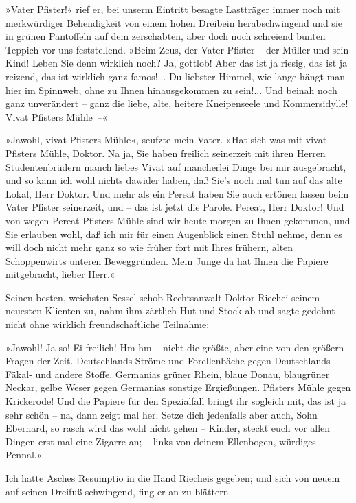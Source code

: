 »Vater Pfister!« rief er, bei unserm Eintritt besagte Lastträger
immer noch mit merkwürdiger Behendigkeit von einem hohen Dreibein
herabschwingend und sie in grünen Pantoffeln auf dem zerschabten,
aber doch noch schreiend bunten Teppich vor uns feststellend. »Beim
Zeus, der Vater Pfister – der Müller und sein Kind! Leben Sie denn
wirklich noch? Ja, gottlob! Aber das ist ja riesig, das ist ja
reizend, das ist wirklich ganz famos!... Du liebster Himmel, wie
lange hängt man hier im Spinnweb, ohne zu Ihnen hinausgekommen zu
sein!... Und beinah noch ganz unverändert – ganz die liebe, alte,
heitere Kneipenseele und Kommersidylle! Vivat Pfisters Mühle~–«

»Jawohl, vivat Pfisters Mühle«, seufzte mein Vater. »Hat sich was
mit vivat Pfisters Mühle, Doktor. Na ja, Sie haben freilich
seinerzeit mit ihren Herren Studentenbrüdern manch liebes Vivat auf
mancherlei Dinge bei mir ausgebracht, und so kann ich wohl nichts
dawider haben, daß Sie's noch mal tun auf das alte Lokal, Herr
Doktor. Und mehr als ein Pereat haben Sie auch ertönen lassen beim
Vater Pfister seinerzeit, und – das ist jetzt die Parole. Pereat,
Herr Doktor! Und von wegen Pereat Pfisters Mühle sind wir heute
morgen zu Ihnen gekommen, und Sie erlauben wohl, daß ich mir für
einen Augenblick einen Stuhl nehme, denn es will doch nicht mehr
ganz so wie früher fort mit Ihres frühern, alten Schoppenwirts
unteren Beweggründen. Mein Junge da hat Ihnen die Papiere
mitgebracht, lieber Herr.«

Seinen besten, weichsten Sessel schob Rechtsanwalt Doktor Riechei
seinem neuesten Klienten zu, nahm ihm zärtlich Hut und Stock ab und
sagte gedehnt – nicht ohne wirklich freundschaftliche Teilnahme:

»Jawohl! Ja so! Ei freilich! Hm hm – nicht die größte, aber eine
von den größern Fragen der Zeit. Deutschlands Ströme und
Forellenbäche gegen Deutschlands Fäkal- und andere Stoffe.
Germanias grüner Rhein, blaue Donau, blaugrüner Neckar, gelbe Weser
gegen Germanias sonstige Ergießungen. Pfisters Mühle gegen
Krickerode! Und die Papiere für den Spezialfall bringt ihr sogleich
mit, das ist ja sehr schön – na, dann zeigt mal her. Setze dich
jedenfalls aber auch, Sohn Eberhard, so rasch wird das wohl nicht
gehen – Kinder, steckt euch vor allen Dingen erst mal eine Zigarre
an; – links von deinem Ellenbogen, würdiges Pennal.«

Ich hatte Asches Resumptio in die Hand Riecheis gegeben; und sich
von neuem auf seinen Dreifuß schwingend, fing er an zu blättern.

